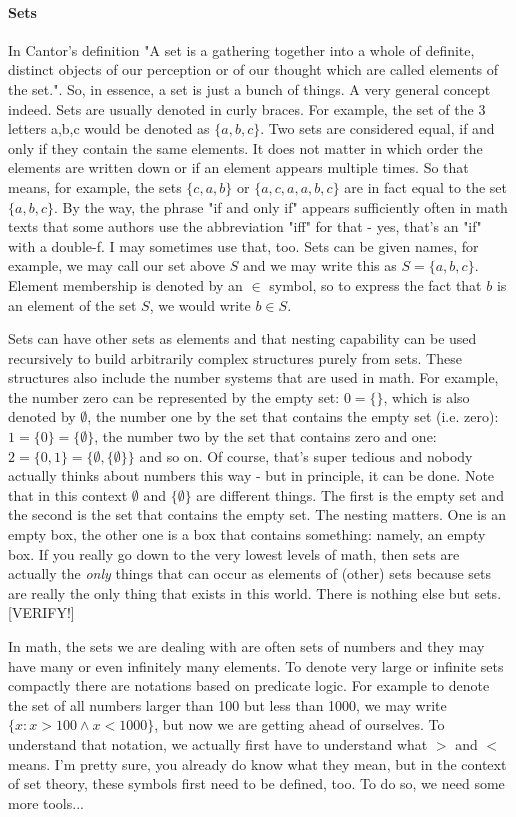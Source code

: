 \paragraph{Sets}
In Cantor's definition "A set is a gathering together into a whole of definite, distinct objects of our perception or of our thought which are called elements of the set.". So, in essence, a set is just a bunch of things. A very general concept indeed. Sets are usually denoted in curly braces. For example, the set of the 3 letters a,b,c would be denoted as $\{a,b,c\}$. Two sets are considered equal, if and only if they contain the same elements. It does not matter in which order the elements are written down or if an element appears multiple times. So that means, for example, the sets $\{c,a,b\}$ or $\{a,c,a,a,b,c\}$ are in fact equal to the set $\{a,b,c\}$. By the way, the phrase "if and only if" appears sufficiently often in math texts that some authors use the abbreviation "iff" for that - yes, that's an "if" with a double-f. I may sometimes use that, too. Sets can be given names, for example, we may call our set above $S$ and we may write this as $S = \{a,b,c\}$. Element membership is denoted by an $\in$ symbol, so to express the fact that $b$ is an element of the set $S$, we would write $b \in S$. 

\medskip 
Sets can have other sets as elements and that nesting capability can be used recursively to build arbitrarily complex structures purely from sets. These structures also include the number systems that are used in math. For example, the number zero can be represented by the empty set: $0 = \{\}$, which is also denoted by $\emptyset$, the number one by the set that contains the empty set (i.e. zero): $1 = \{ 0 \} =  \{ \emptyset \}$, the number two by the set that contains zero and one: $2 = \{ 0, 1 \} = \{ \emptyset, \{ \emptyset \} \}$ and so on. Of course, that's super tedious and nobody actually thinks about numbers this way - but in principle, it can be done. Note that in this context $\emptyset$ and $\{ \emptyset \}$ are different things. The first is the empty set and the second is the set that contains the empty set. The nesting matters. One is an empty box, the other one is a box that contains something: namely, an empty box. If you really go down to the very lowest levels of math, then sets are actually the \emph{only} things that can occur as elements of (other) sets because sets are really the only thing that exists in this world. There is nothing else but sets. [VERIFY!]

\medskip 
In math, the sets we are dealing with are often sets of numbers and they may have many or even infinitely many elements. To denote very large or infinite sets compactly there are notations based on predicate logic. For example to denote the set of all numbers larger than 100 but less than 1000, we may write $\{x : x > 100 \wedge x < 1000\}$, but now we are getting ahead of ourselves. To understand that notation, we actually first have to understand what $>$ and $<$ means. I'm pretty sure, you already do know what they mean, but in the context of set theory, these symbols first need to be defined, too. To do so, we need some more tools...

